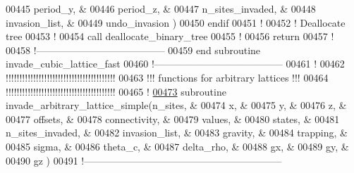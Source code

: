 \begin{DoxyCode}
00445                                      period\_y,          &
00446                                      period\_z,          &
00447                                      n\_sites\_invaded,   &
00448                                      invasion\_list,     &
00449                                      undo\_invasion      )
00450     \textcolor{keyword}{endif}
00451     \textcolor{comment}{!}
00452     \textcolor{comment}{! Deallocate tree}
00453     \textcolor{comment}{!}
00454     call deallocate\_binary\_tree
00455     \textcolor{comment}{!}
00456     return
00457     \textcolor{comment}{!}
00458   \textcolor{comment}{!---------------------------------------}
00459 \textcolor{keyword}{  end subroutine invade\_cubic\_lattice\_fast}
00460   \textcolor{comment}{!---------------------------------------}
00461   \textcolor{comment}{!}
00462 \textcolor{comment}{!!!!!!!!!!!!!!!!!!!!!!!!!!!!!!!!!!!!!!!!}
00463 \textcolor{comment}{!!! functions for arbitrary lattices !!!}
00464 \textcolor{comment}{!!!!!!!!!!!!!!!!!!!!!!!!!!!!!!!!!!!!!!!!}
00465   \textcolor{comment}{!}
\hypertarget{module__invasion__percolation_8f90_source_l00473}{}\hyperlink{classmodule__invasion__percolation_a0da324ef25bd77f5a4d986a19d401902}{00473}   \textcolor{keyword}{subroutine }invade\_arbitrary\_lattice\_simple(n\_sites,         &
00474                                              x,               &
00475                                              y,               &
00476                                              z,               &
00477                                              offsets,         &
00478                                              connectivity,    &
00479                                              values,          &
00480                                              states,          &
00481                                              n\_sites\_invaded, &
00482                                              invasion\_list,   &
00483                                              gravity,         &
00484                                              trapping,        &
00485                                              sigma,           &
00486                                              theta\_c,         &
00487                                              delta\_rho,       &
00488                                              gx,              &
00489                                              gy,              &
00490                                              gz               )
00491   \textcolor{comment}{!------------------------------------------------------------}

\end{DoxyCode}
